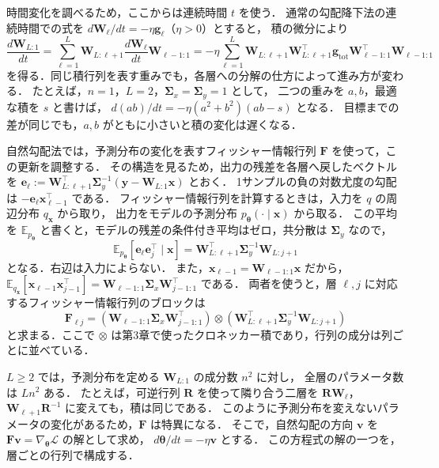 \documentclass[../main.tex]{subfiles}
\begin{document}
時間変化を調べるため，ここからは連続時間 $t$ を使う．
通常の勾配降下法の連続時間での式を $d\bm{W}_\ell/dt=-\eta\bm{g}_\ell$（$\eta>0$）とすると，
積の微分により
\begin{equation}
  \frac{d\bm{W}_{L:1}}{dt}
  =\sum_{\ell=1}^L\bm{W}_{L:\ell+1}
  \frac{d\bm{W}_\ell}{dt}\bm{W}_{\ell-1:1}
  =-\eta\sum_{\ell=1}^L
  \bm{W}_{L:\ell+1}\bm{W}_{L:\ell+1}^\top\bm{g}_{\mathrm{tot}}
  \bm{W}_{\ell-1:1}^\top\bm{W}_{\ell-1:1}
  \label{eq:linear-gradient-flow}
\end{equation}
を得る．同じ積行列を表す重みでも，各層への分解の仕方によって進み方が変わる．
たとえば，$n=1$，$L=2$，$\bm{\Sigma}_{x}=\bm{\Sigma}_{y}=1$ として，
二つの重みを $a,b$，最適な積を $s$ と書けば，
$d(ab)/dt=-\eta(a^2+b^2)(ab-s)$ となる．
目標までの差が同じでも，$a,b$ がともに小さいと積の変化は遅くなる．

自然勾配法では，予測分布の変化を表すフィッシャー情報行列 $\bm{F}$ を使って，この更新を調整する．
その構造を見るため，出力の残差を各層へ戻したベクトルを
$\bm{e}_\ell:=\bm{W}_{L:\ell+1}^\top\bm{\Sigma}_{y}^{-1}(\bm{y}-\bm{W}_{L:1}\bm{x})$ とおく．
1サンプルの負の対数尤度の勾配は $-\bm{e}_\ell\bm{x}_{\ell-1}^\top$ である．
フィッシャー情報行列を計算するときは，入力を $q$ の周辺分布 $q_{\bm{x}}$ から取り，
出力をモデルの予測分布 $p_{\bm{\theta}}(\cdot\mid\bm{x})$ から取る．
この平均を $\mathbb{E}_{p_{\bm{\theta}}}$ と書くと，モデルの残差の条件付き平均はゼロ，共分散は $\bm{\Sigma}_{y}$ なので，
\begin{equation}
  \mathbb{E}_{p_{\bm{\theta}}}
  [\bm{e}_\ell\bm{e}_j^\top\mid\bm{x}]
  =\bm{W}_{L:\ell+1}^\top\bm{\Sigma}_{y}^{-1}\bm{W}_{L:j+1}
  \label{eq:linear-error-moment}
\end{equation}
となる．右辺は入力によらない．
また，$\bm{x}_{\ell-1}=\bm{W}_{\ell-1:1}\bm{x}$ だから，
$\mathbb{E}_{q_{\bm{x}}}[\bm{x}_{\ell-1}\bm{x}_{j-1}^\top]
=\bm{W}_{\ell-1:1}\bm{\Sigma}_{x}\bm{W}_{j-1:1}^\top$ である．
両者を使うと，層 $\ell,j$ に対応するフィッシャー情報行列のブロックは
\begin{equation}
  \bm{F}_{\ell j}
  =(\bm{W}_{\ell-1:1}\bm{\Sigma}_{x}\bm{W}_{j-1:1}^\top)
  \otimes(\bm{W}_{L:\ell+1}^\top\bm{\Sigma}_{y}^{-1}\bm{W}_{L:j+1})
  \label{eq:linear-fisher-blocks}
\end{equation}
と求まる．ここで $\otimes$ は第3章で使ったクロネッカー積であり，行列の成分は列ごとに並べている．

$L\geq2$ では，予測分布を定める $\bm{W}_{L:1}$ の成分数 $n^2$ に対し，
全層のパラメータ数は $Ln^2$ ある．
たとえば，可逆行列 $\bm{R}$ を使って隣り合う二層を $\bm{R}\bm{W}_\ell$，$\bm{W}_{\ell+1}\bm{R}^{-1}$ に変えても，積は同じである．
このように予測分布を変えないパラメータの変化があるため，$\bm{F}$ は特異になる．
そこで，自然勾配の方向 $\bm{v}$ を $\bm{F}\bm{v}=\nabla_{\bm{\theta}}\mathcal{L}$ の解として求め，
$d\bm{\theta}/dt=-\eta\bm{v}$ とする．
この方程式の解の一つを，層ごとの行列で構成する．
\end{document}
